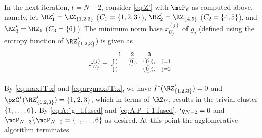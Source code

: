 \begin{example}
	In the next iteration, $l=N-2$, consider \eqref{eq:Z'} with $\mcP_{\ell}$ as computed above,
	namely, let $\RZ'_1 = \RZ_{\Set{1,2,3}}$ ($C_1=\{1,2,3\}$), $\RZ'_{2} = \RZ_{\Set{4,5}}$ ($C_2=\{4,5\}$), and $\RZ'_{3} = \RZ_{6}$ ($C_3=\{6\}$).
	The minimum norm base $x_{U_{j}}^{(j)}$ of $g_{j}$ (defined using the entropy function of
	$\RZ'_{\Set{1,2,3}}$) is given as
	\begin{align*}
		x_{U_j}^{(j)} =\scalebox{0.8}{
		\begin{blockarray}{rc c c}
			\phantom{n}1 & 2   & 3 \\
						\begin{block}{\{l cc c}
							(& \circled{0},   & \circled{0}),   & j=1 \\
							(&     &               \circled{0}),   & j=2 \\
						\end{block}
		\end{blockarray}}
		\end{align*}
	By \eqref{eq:maxJT:x} and \eqref{eq:argmaxJT:x}, we have
	$I^{*}(\RZ'_{\Set{1,2,3}}) = 0$ and $\pzC^{*}(\RZ'_{\Set{1,2,3}}) = \Set{1,2,3}$, which in terms of
	$\RZ_{V}$, results in the trivial cluster $\{1,\dots,6\}$.
	By \eqref{eq:A:`g_l:fused} and \eqref{eq:A:P_i-1:fused},
	$`g_{N-2}=0$ and $\mcP_{N-3} \backslash \mcP_{N-2} = \Set{1,\ldots,6}$ as desired.
	At this point the agglomerative algorithm
	terminates.
\end{example}

